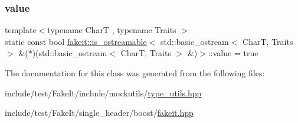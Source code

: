 \subsubsection{\texorpdfstring{value}{value}}
{\footnotesize\ttfamily template$<$typename CharT , typename Traits $>$ \\
static const bool \mbox{\hyperlink{classfakeit_1_1is__ostreamable}{fakeit\+::is\+\_\+ostreamable}}$<$ std\+::basic\+\_\+ostream$<$ CharT, Traits $>$ \&($\ast$)(std\+::basic\+\_\+ostream$<$ CharT, Traits $>$ \&)$>$\+::value = true\hspace{0.3cm}{\ttfamily [static]}}



The documentation for this class was generated from the following files\+:\begin{DoxyCompactItemize}
\item 
include/test/\+Fake\+It/include/mockutils/\mbox{\hyperlink{type__utils_8hpp}{type\+\_\+utils.\+hpp}}\item 
include/test/\+Fake\+It/single\+\_\+header/boost/\mbox{\hyperlink{single__header_2boost_2fakeit_8hpp}{fakeit.\+hpp}}\end{DoxyCompactItemize}

